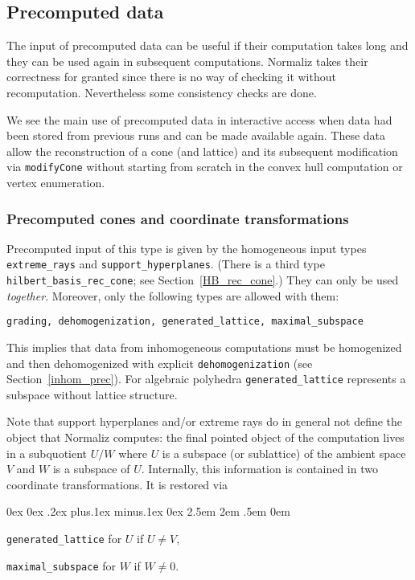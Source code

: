 \documentclass[12pt,a4paper]{scrartcl}
\newcounter{listi}
\newcommand{\stdli}{ \topsep0ex \partopsep0ex %
\parsep.2ex plus.1ex minus.1ex \itemsep0ex%
\leftmargin2.5em \labelwidth2em \labelsep.5em \rightmargin0em}%
\newenvironment{arab}{\begin{list}{\textup{(\arabic{listi})}}%
	{\usecounter{listi}\stdli}}{\end{list}}
\theoremstyle{definition}
\begin{document}
\subsection{Precomputed data}\label{precomputed_data}

The input of precomputed data can be useful if their computation takes long and they can be used again in subsequent computations. Normaliz takes their correctness for granted since there is no way of checking it without recomputation. Nevertheless some consistency checks are done.

We see the main use of precomputed data in interactive access when data had been stored from previous runs and can be made available again. These data allow the reconstruction of a cone (and lattice) and its subsequent modification via \verb|modifyCone| without starting from scratch in the convex hull computation or vertex enumeration.

\subsubsection{Precomputed cones and coordinate transformations}

Precomputed input of this type is given by the homogeneous input types \verb|extreme_rays| and \verb|support_hyperplanes|. (There is a third type \verb|hilbert_basis_rec_cone|; see Section~\ref{HB_rec_cone}.) They can only be used \emph{together}. Moreover, only the following types are allowed with them:
\begin{center}
	\verb|grading, dehomogenization, generated_lattice, maximal_subspace|
\end{center}
This implies that data from inhomogeneous computations must be homogenized and then dehomogenized with explicit \verb|dehomogenization| (see Section~\ref{inhom_prec}). For algebraic polyhedra \verb|generated_lattice| represents a subspace without lattice structure.

Note that support hyperplanes and/or extreme rays do in general not define the object that Normaliz computes: the final pointed object of the computation lives in a subquotient $U/W$ where $U$ is a subspace (or sublattice) of the ambient space $V$ and $W$ is a subspace of $U$. Internally, this information is contained in two coordinate transformations. It is restored via
\begin{arab}
	\item \verb|generated_lattice| for $U$ if $U\neq V$,
	\item \verb|maximal_subspace| for $W$ if $W\neq 0$.
\end{arab}
\end{document}
